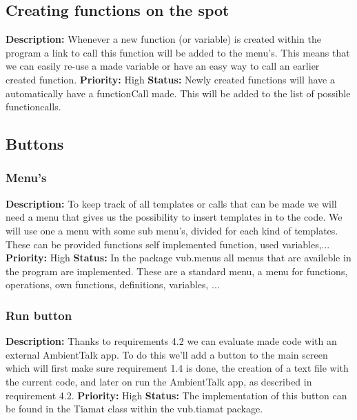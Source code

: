 \documentclass[a4paper,12pt]{report}
\begin{document}
\subsection{Creating functions on the spot}
\textbf{Description: } Whenever a new function (or variable) is created within the program a link to call this function will be added to the menu's. This means that we can
easily re-use a made variable or have an easy way to call an earlier created function. \newline
\textbf{Priority:} High \newline
\textbf{Status: } Newly created functions will have a automatically have a functionCall made. This will be added to the list of possible
functioncalls.\newline
\subsection{Buttons}
\subsubsection{Menu's}
\textbf{Description: } To keep track of all templates or calls that can be made we will need a menu that gives us the possibility to insert templates in to the code.
We will use one a menu with some sub menu's, divided for each kind of templates. These can be provided functions self implemented function, used variables,... \newline
\textbf{Priority:} High \newline
\textbf{Status: } In the package vub.menus all menus that are availeble in the program are implemented. These are a standard menu, a menu for functions, operations, own functions, definitions, variables, ...\newline
\subsubsection{Run button}
\textbf{Description: } Thanks to requirements 4.2 we can evaluate made code with an external AmbientTalk app. To do this we'll add a button
to the main screen which will first make sure requirement 1.4 is done, the creation of a text file with the current code, and later on run the AmbientTalk app, as described in requirement 4.2.
\textbf{Priority:} High \newline
\textbf{Status: } The implementation of this button can be found in the Tiamat class within the vub.tiamat package.\newline
\end{document}
